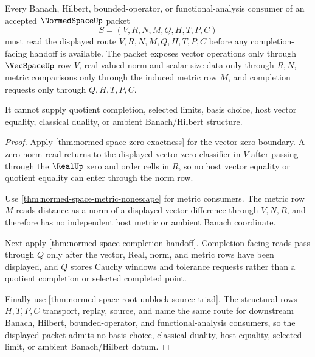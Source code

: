 \begin{theorem}
\label{thm:normed-space-banach-completion-nonescape}
Every Banach, Hilbert, bounded-operator, or functional-analysis consumer of an accepted $\NormedSpaceUp$ packet
$$
S=(V,R,N,M,Q,H,T,P,C)
$$
must read the displayed route $V,R,N,M,Q,H,T,P,C$ before any completion-facing handoff is available. The packet exposes vector operations only through $\VecSpaceUp$ row $V$, real-valued norm and scalar-size data only through $R,N$, metric comparisons only through the induced metric row $M$, and completion requests only through $Q,H,T,P,C$.

It cannot supply quotient completion, selected limits, basis choice, host vector equality, classical duality, or ambient Banach/Hilbert structure.
\end{theorem}
\begin{proof}
Apply \autoref{thm:normed-space-zero-exactness} for the vector-zero boundary. A zero norm read returns to the displayed vector-zero classifier in $V$ after passing through the $\RealUp$ zero and order cells in $R$, so no host vector equality or quotient equality can enter through the norm row.

Use \autoref{thm:normed-space-metric-nonescape} for metric consumers. The metric row $M$ reads distance as a norm of a displayed vector difference through $V,N,R$, and therefore has no independent host metric or ambient Banach coordinate.

Next apply \autoref{thm:normed-space-completion-handoff}. Completion-facing reads pass through $Q$ only after the vector, Real, norm, and metric rows have been displayed, and $Q$ stores Cauchy windows and tolerance requests rather than a quotient completion or selected completed point.

Finally use \autoref{thm:normed-space-root-unblock-source-triad}. The structural rows $H,T,P,C$ transport, replay, source, and name the same route for downstream Banach, Hilbert, bounded-operator, and functional-analysis consumers, so the displayed packet admits no basis choice, classical duality, host equality, selected limit, or ambient Banach/Hilbert datum.
\end{proof}

